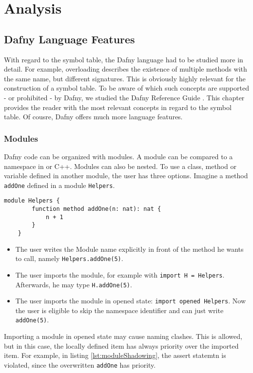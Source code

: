 \section{Analysis}
\subsection{Dafny Language Features}
With regard to the symbol table, the Dafny language had to be studied more in detail. For example, overloading describes the existence of multiple methods with the same name, but different signatures. This is obviously highly relevant for the construction of a symbol table.
To be aware of which such concepts are supported - or prohibited - by Dafny, we studied the Dafny Reference Guide \cite{dafnyReferenceManual}. This chapter provides the reader with the most relevant concepts in regard to the symbol table. Of cousre, Dafny offers much more language features.


\subsubsection{Modules}
Dafny code can be organized with modules. A module can be compared to a namespace in \Csharp or C++. Modules can also be nested. To use a class, method or variable defined in another module, the user has three options. Imagine a method \texttt{addOne} defined in a module \texttt{Helpers}.

\begin{lstlisting}[caption={Module Example}, captionpos=b, label={lst:shadowing}]
    module Helpers {
        function method addOne(n: nat): nat {
            n + 1
        }
    }
\end{lstlisting}

\begin{itemize}
    \item The user writes the Module name explicitly in front of the method he wants to call, \linebreak namely \texttt{Helpers.addOne(5)}.
    \item The user imports the module, for example with \texttt{import H = Helpers}. Afterwards, he may type \texttt{H.addOne(5)}.
    \item The user imports the module in opened state: \texttt{import opened Helpers}. Now the user is eligible to skip the namespace identifier and can just write \texttt{addOne(5)}.
\end{itemize}

Importing a module in opened state may cause naming clashes. This is allowed, but in this case, the locally defined item has always priority over the imported item. For example, in listing \ref{lst:moduleShadowing}, the assert statemtn is violated, since the overwritten \texttt{addOne} has priority. \cite{functionVSMethod}


